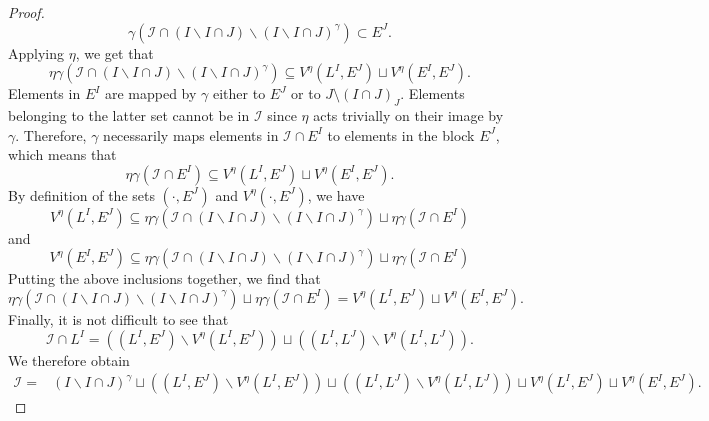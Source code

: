 \documentclass[11pt, a4paper, oneside, reqno]{amsart}
\theoremstyle{remark}
\theoremstyle{definition}
\numberwithin{equation}{section}
\begin{document}
\begin{proof}
    $$
		\gamma(\mathcal{I}\cap(I\backslash I\cap J)\backslash(I\backslash I\cap J)^{\gamma}) \subset E^J.
	$$
    Applying $\eta$, we get that
	\begin{equation*}
		\eta\gamma(\mathcal{I}\cap(I\backslash I\cap J)\backslash(I\backslash I\cap J)^{\gamma}) \subseteq V^{\eta}(L^I,E^J)\sqcup V^{\eta}(E^I,E^J).
	\end{equation*}
    Elements in $E^I$ are mapped by $\gamma$ either to $E^J$ or to $J\setminus (I\cap J)_J$. Elements belonging to the latter set cannot be in $\mathcal{I}$ since $\eta$ acts trivially on their image by $\gamma$. Therefore, $\gamma$ necessarily maps elements in $\mathcal{I}\cap E^I$ to elements in the block $E^J$, which means that
    $$
		\eta\gamma(\mathcal{I}\cap E^I) \subseteq V^{\eta}(L^I,E^J)\sqcup V^{\eta}(E^I,E^J).
	$$
    By definition of the sets $(\cdot, E^J)$ and $V^{\eta}(\cdot,E^J)$, we have
    $$
    V^\eta(L^I,E^J)\subseteq \eta\gamma(\mathcal{I}\cap(I\backslash I\cap J)\backslash(I\backslash I\cap J)^{\gamma})\sqcup \eta\gamma(\mathcal{I}\cap E^I)
    $$
    and
    $$
    V^\eta(E^I,E^J) \subseteq \eta\gamma(\mathcal{I}\cap(I\backslash I\cap J)\backslash(I\backslash I\cap J)^{\gamma})\sqcup \eta\gamma(\mathcal{I}\cap E^I)
    $$
    Putting the above inclusions together, we find that
    $$
  \eta\gamma(\mathcal{I}\cap(I\backslash I\cap J)\backslash(I\backslash I\cap J)^{\gamma})\sqcup \eta\gamma(\mathcal{I}\cap E^I) =   V^\eta(L^I,E^J) \sqcup V^\eta(E^I,E^J).
    $$
    Finally, it is not difficult to see that
	\begin{equation*}
		\mathcal{I}\cap L^I= ((L^I,E^J)\backslash V^{\eta}(L^I,E^J))  \sqcup ((L^I,L^J)\backslash V^{\eta}(L^I,L^J)).
	\end{equation*}
	We therefore obtain 
	\begin{align*}
		\mathcal{I} = & (I\backslash I\cap J)^{\gamma} \sqcup ((L^I,E^J)\backslash V^{\eta}(L^I,E^J))       \sqcup ((L^I,L^J)\backslash V^{\eta}(L^I,L^J))                                                  \sqcup V^{\eta}(L^I,E^J)\sqcup  V^{\eta}(E^I,E^J).
	\end{align*}



\end{proof}
\end{document}
